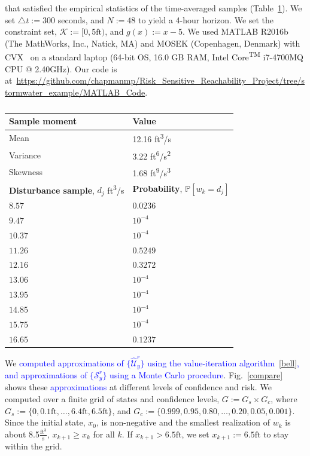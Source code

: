 \documentclass[letterpaper, 10 pt, conference]{ieeeconf}  %
\begin{document}
that satisfied the empirical statistics of the time-averaged samples (Table~\ref{dist}). 
We set $\triangle t := 300$ seconds, and $N := 48$ to yield a 4-hour horizon.
We set the constraint set, $\mathcal{K} := [0, 5\text{ft})$, and $g(x) := x - 5$.
We used MATLAB R2016b (The MathWorks, Inc., Natick, MA) and MOSEK (Copenhagen, Denmark) with CVX~\cite{grant2008cvx} on a
standard laptop (64-bit OS, 16.0 GB RAM, Intel\textsuperscript{\textregistered} Core\textsuperscript{TM} i7-4700MQ CPU @ 2.40GHz).
Our code is at~\url{https://github.com/chapmanmp/Risk_Sensitive_Reachability_Project/tree/stormwater_example/MATLAB_Code}.
%
\begin{table}
\begin{center}
\caption{}
\begin{tabular}{| p{3.5cm} | p{3.5cm} |}
\hline
\bf{Sample moment} & \bf{Value}  \\ \hline
Mean & 12.16 ft\textsuperscript{3}/s \\ 
Variance & 3.22 ft\textsuperscript{6}/s\textsuperscript{2} \\ 
Skewness & 1.68 ft\textsuperscript{9}/s\textsuperscript{3} \\ 
\hline 
\textbf{Disturbance sample}, $d_j$ ft\textsuperscript{3}/s & \textbf{Probability}, $\mathbb{P}[w_k = d_j]$ \\ \hline
$8.57$ 		& $0.0236$ \\
$9.47$ 		& $10^{-4}$ \\
$10.37$ 		& $10^{-4}$ \\
$11.26$  & $0.5249$ \\ 
$12.16$ & $0.3272$ \\ 
$13.06$  & $10^{-4}$ \\ 
$13.95$  & $10^{-4}$ \\ 
$14.85$  & $10^{-4}$ \\ 
$15.75$  & $10^{-4}$ \\ 
$16.65$  & $0.1237$ \\ \hline
\end{tabular}
\begin{flushleft} \end{flushleft}
\label{dist}
\end{center}
\end{table}
%

We \textcolor{blue}{computed approximations of $\{\widehat{\mathcal{U}}_y^r\}$ using the value-iteration algorithm~\eqref{bell},
and approximations of $\{\mathcal{S}_y^r\}$ using a Monte Carlo procedure}.
Fig.~\ref{compare} shows these \textcolor{blue}{approximations} at different levels of confidence and risk.
We computed over a finite grid of states and confidence levels, $G := G_s \times G_c$, where  
$G_s := \{0, 0.1\text{ft}, \dots, 6.4\text{ft}, 6.5\text{ft}\}$,
and $G_c := \{0.999, 0.95, 0.80, \dots, 0.20, 0.05, 0.001\}$.
Since the initial state, $x_0$, is non-negative and the smallest realization of $w_k$ is about 8.5$\frac{\text{ft}^3}{\text{s}}$, 
$x_{k+1}\geq x_k$ for all $k$. 
If $x_{k+1} > 6.5\text{ft}$, we set $x_{k+1} := 6.5\text{ft}$ to stay within the grid.
\end{document}
